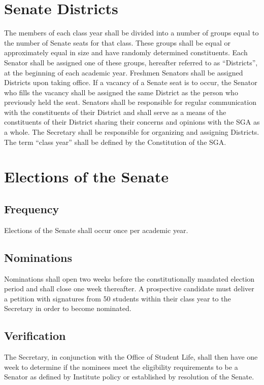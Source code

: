 \documentclass[12pt]{scrreprt}
\begin{document}
\section{Senate Districts}
The members of each class year shall be divided into a number of groups equal to the number of Senate seats for that class. These groups shall be equal or approximately equal in size and have randomly determined constituents. Each Senator shall be assigned one of these groups, hereafter referred to as “Districts”, at the beginning of each academic year. Freshmen Senators shall be assigned Districts upon taking office. If a vacancy of a Senate seat is to occur, the Senator who fills the vacancy shall be assigned the same District as the person who previously held the seat. Senators shall be responsible for regular communication with the constituents of their District and shall serve as a means of the constituents of their District sharing their concerns and opinions with the SGA as a whole. The Secretary shall be responsible for organizing and assigning Districts. The term “class year” shall be defined by the Constitution of the SGA.

\section{Elections of the Senate}

\subsection{Frequency}
Elections of the Senate shall occur once per academic year. 

\subsection{Nominations}
Nominations shall open two weeks before the constitutionally mandated election 
period and shall close one week thereafter. A prospective candidate must 
deliver a petition with signatures from 50 students within their class year to 
the Secretary in order to become nominated.

\subsection{Verification} \label{sec:election_verification}
The Secretary, in conjunction with the Office of Student Life, shall then have 
one week to determine if the nominees meet the eligibility requirements to be 
a Senator as defined by Institute policy or established by resolution of the 
Senate. 
\end{document}
